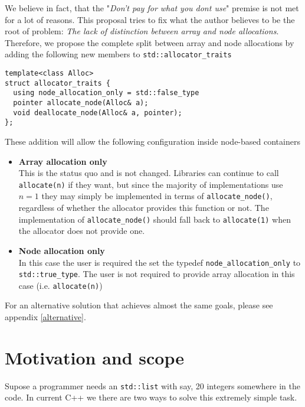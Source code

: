 \documentclass[11pt]{article}
\begin{document}
We believe in fact, that the "{\it Don't pay for what you dont use}" premise
is not met for a lot of reasons. This proposal tries to fix what the author
believes to be the root of problem: {\it The lack of distinction between array
and node allocations}.  Therefore, we propose the complete split between array
and node allocations by adding the following new members to
\texttt{std::allocator\_traits}
\medskip
\begin{lstlisting}
template<class Alloc>
struct allocator_traits {
  using node_allocation_only = std::false_type
  pointer allocate_node(Alloc& a);
  void deallocate_node(Alloc& a, pointer);
};
\end{lstlisting}
These addition will allow the following configuration inside node-based
containers
\begin{itemize}
\item {\bf Array allocation only} \\
This is the status quo and is not changed. Libraries can continue to call
\texttt{allocate(n)} if they want, but since the majority of implementations
use $n = 1$ they may simply be implemented in terms of
\texttt{allocate\_node()}, regardless of whether the allocator provides this
function or not. The implementation of \texttt{allocate\_node()} should fall
back to \texttt{allocate(1)} when the allocator does not provide one.

\item {\bf Node allocation only} \\
In this case the user is required the set the typedef \texttt{node\_allocation\_only}
to \texttt{std::true\_type}. The user is not required to provide array allocation
in this case (i.e. \texttt{allocate(n)})
\end{itemize}

For an alternative solution that achieves almost the same goals, please see
appendix \ref{alternative}.

\section{Motivation and scope}

Supose a programmer needs an \texttt{std::list} with say, 20
integers somewhere in the code. In current C++ we there are
two ways to solve this extremely simple task.
\end{document}
